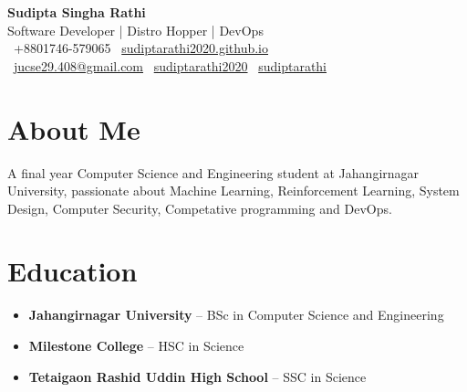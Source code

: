 \documentclass[a4paper,10pt]{article}
\begin{document}
\begin{minipage}{0.70\textwidth}
    {\LARGE\bfseries Sudipta Singha Rathi}\\[0.5em]
    {\large Software Developer | Distro Hopper | DevOps}\\[0.5em]
    \faPhone \ +8801746-579065 \quad
    \faGlobe \ \href{https://sudiptarathi2020.github.io}{sudiptarathi2020.github.io}\\
    \faEnvelope \ \href{mailto:jucse29.408@gmail.com}{jucse29.408@gmail.com} 
    \faGithub \ \href{https://github.com/sudiptarathi2020}{sudiptarathi2020}
    \faLinkedin \ \href{https://www.linkedin.com/in/sudiptarathi/}{sudiptarathi} \quad
    
\end{minipage}%
\hfill
\begin{minipage}{0.30\textwidth}
    \raggedleft
\end{minipage}

\vspace{1em}

\section*{About Me}
A final year Computer Science and Engineering student at Jahangirnagar University, passionate about Machine Learning, Reinforcement Learning, System Design, Computer Security, Competative programming and DevOps.

\section*{Education}
\begin{itemize}[leftmargin=0.5cm]
    \item \textbf{Jahangirnagar University} – BSc in Computer Science and Engineering
    \item \textbf{Milestone College} – HSC in Science
    \item \textbf{Tetaigaon Rashid Uddin High School} – SSC in Science
\end{itemize}
\end{document}
